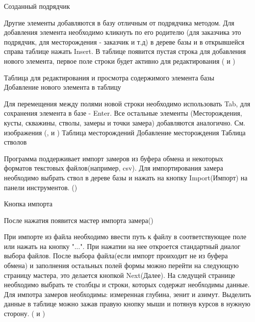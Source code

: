 {Созданный подрядчик}

Другие элементы добавляются в базу отличным от подрядчика методом. Для добавления элемента необходимо кликнуть по его родителю
(для заказчика это подрядчик, для месторождения - заказчик и т.д) в дереве базы и в открывшейся справа таблице нажать Insert.
В таблице появится пустая строка для добавления нового элемента, первое поле строки будет активно для редактирования
( и )

{Таблица для редактирования и просмотра содержимого элемента базы}
{Добавление нового элемента в таблицу}

Для перемещения между полями новой строки необходимо использовать Tab, для сохранения элемента в базе - Enter. Все остальные элементы
(Месторождения, кусты, скважины, стволы, замеры и точки замера) добавляются аналогично. См. изображения
(,  и )
{Таблица месторождений}
{Добавление месторождения}
{Таблица стволов}

Программа поддерживает импорт замеров из буфера обмена и некоторых форматов текстовых файлов(например, csv).
Для импортирования замера необходимо выбрать ствол в дереве базы и нажать на кнопку Import(Импорт) на панели инструментов.
()

{Кнопка импорта}

После нажатия появится мастер импорта замера()


При импорте из файла необходимо ввести путь к файлу в соответствующее поле или нажать на кнопку "...".
При нажатии на нее откроется стандартный диалог выбора файлов. После выбора файла(если импорт проиходит не из буфера обмена) и
заполнения остальных полей формы можно перейти на следующую страницу мастера, это делается кнопкой Next(Далее).
На следущей странице необходимо выбрать те столбцы и строки, которых содержат необходимы данные. Для импотра замеров необходимы: измеренная глубина, зенит и азимут.
Выделить данные в таблице можно зажав правую кнопку мыши и потянув курсов в нужную сторону.
( и )

